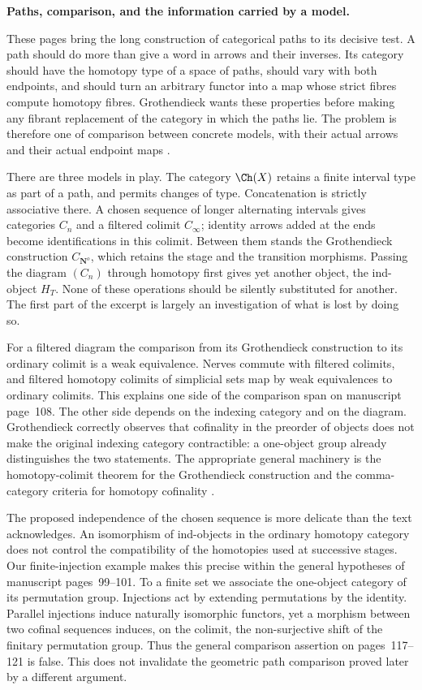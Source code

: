 \begingroup
{}
\noindent\textbf{Paths, comparison, and the information carried by a model.}

These pages bring the long construction of categorical paths to its decisive
test.  A path should do more than give a word in arrows and their inverses.  Its
category should have the homotopy type of a space of paths, should vary with
both endpoints, and should turn an arbitrary functor into a map whose strict
fibres compute homotopy fibres.  Grothendieck wants these properties before
making any fibrant replacement of the category in which the paths lie.  The
problem is therefore one of comparison between concrete models, with their
actual arrows and their actual endpoint maps
\citep[ms.~108--171]{GrothendieckDerivateursVII}.

There are three models in play.  The category $\Ch(X)$ retains a finite interval
type as part of a path, and permits changes of type.  Concatenation is strictly
associative there.  A chosen sequence of longer alternating intervals gives
categories $C_n$ and a filtered colimit $C_\infty$; identity arrows added at the
ends become identifications in this colimit.  Between them stands the
Grothendieck construction $C_{\mathbf N^o}$, which retains the stage and the
transition morphisms.  Passing the diagram $(C_n)$ through homotopy first gives
yet another object, the ind-object $H_T$.  None of these operations should be
silently substituted for another.  The first part of the excerpt is largely
an investigation of what is lost by doing so.

For a filtered diagram the comparison from its Grothendieck construction to
its ordinary colimit is a weak equivalence.  Nerves commute with filtered
colimits, and filtered homotopy colimits of simplicial sets map by weak
equivalences to ordinary colimits.  This explains one side of the comparison
span on manuscript page~108.  The other side depends on the indexing category
and on the diagram.  Grothendieck correctly observes that cofinality in the
preorder of objects does not make the original indexing category contractible:
a one-object group already distinguishes the two statements.  The appropriate
general machinery is the homotopy-colimit theorem for the Grothendieck
construction and the comma-category criteria for homotopy cofinality
\citep{Thomason1979,Quillen1973}.

The proposed independence of the chosen sequence is more delicate than the
text acknowledges.  An isomorphism of ind-objects in the ordinary homotopy
category does not control the compatibility of the homotopies used at
successive stages.  Our finite-injection example makes this precise within the
general hypotheses of manuscript pages~99--101.  To a finite set we associate
the one-object category of its permutation group.  Injections act by extending
permutations by the identity.  Parallel injections induce naturally isomorphic
functors, yet a morphism between two cofinal sequences induces, on the colimit,
the non-surjective shift of the finitary permutation group.  Thus the general
comparison assertion on pages~117--121 is false.  This does not invalidate the
geometric path comparison proved later by a different argument.


